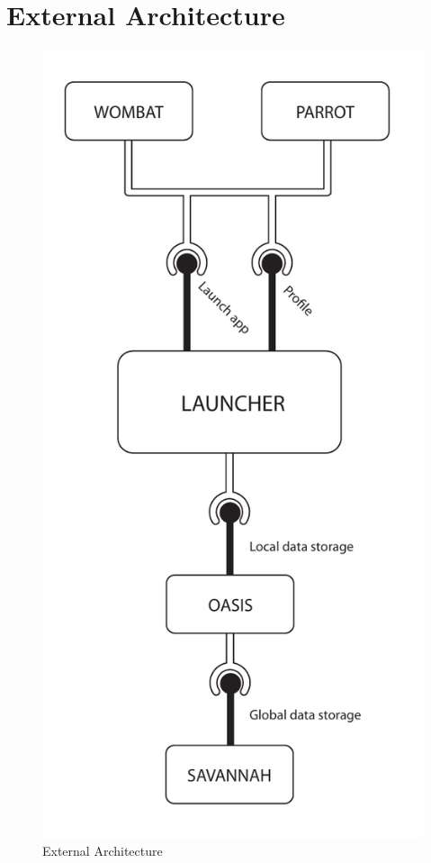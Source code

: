 \section{External Architecture}

\begin{figure}[h]
	\centering
	\includegraphics[width=1\textwidth]{gfx/external_architecture.pdf}
	\caption{External Architecture}
	\label{fig:external_architecture}
\end{figure}